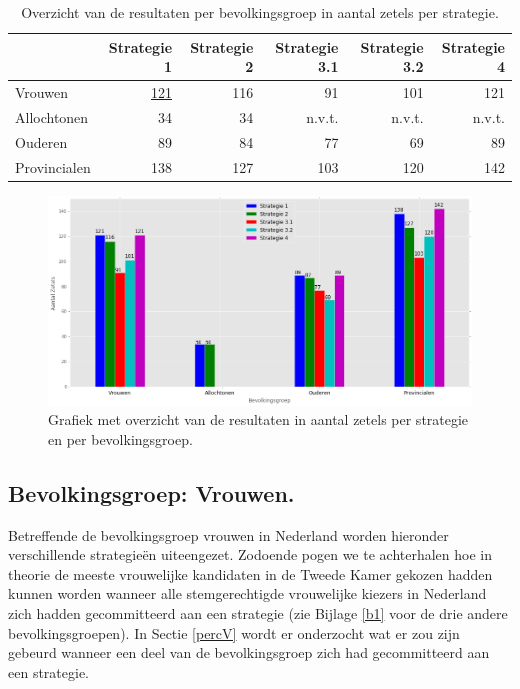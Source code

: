 \begin{table}[h]
\captionsetup{skip=-2pt}
\begin{center}
\begin{footnotesize}
\begin{tabular}{lrrrrr}
\toprule
{} &  Strategie 1 &  Strategie 2 &  Strategie 3.1 &  Strategie 3.2 &  Strategie 4 \\
\midrule
Vrouwen      &         \hyperref[S1V]{121} &          116 &             91 &            101 &          121 \\
Allochtonen  &           34 &           34 &            n.v.t. &           n.v.t. &          n.v.t. \\
Ouderen      &           89 &           84 &             77 &             69 &           89 \\
Provincialen &          138 &          127 &            103 &            120 &          142 \\
\bottomrule
			
			
\end{tabular}
\end{footnotesize}
\end{center}
\caption{Overzicht van de resultaten per bevolkingsgroep in aantal zetels per strategie.}
\label{table:S_overzicht} 
\end{table}


\begin{figure}[H]
\captionsetup{skip=0pt}

	\includegraphics[width=0.95\linewidth]{overzicht_resultaten_strategien_plot.png}

			\caption{Grafiek met overzicht van de resultaten in aantal zetels per strategie en per bevolkingsgroep.}

\label{fig:S_overzicht}
\end{figure}


\subsection{Bevolkingsgroep: Vrouwen.}
\label{vrouwen}
Betreffende de bevolkingsgroep vrouwen in Nederland worden hieronder verschillende strategie\"{e}n uiteengezet. Zodoende pogen we te achterhalen hoe in theorie de meeste vrouwelijke kandidaten in de Tweede Kamer gekozen hadden kunnen worden wanneer alle stemgerechtigde vrouwelijke kiezers in Nederland zich hadden gecommitteerd aan een strategie (zie Bijlage \ref{b1} voor de drie andere bevolkingsgroepen). In Sectie \ref{percV} wordt er onderzocht wat er zou zijn gebeurd wanneer een deel van de bevolkingsgroep zich had gecommitteerd aan een strategie. 

